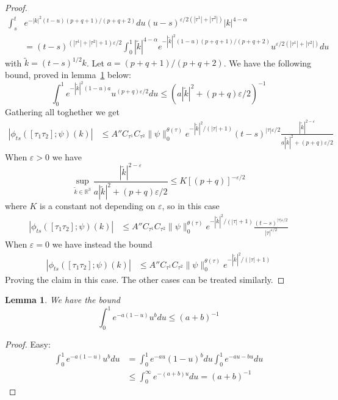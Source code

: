 \documentclass[a4paper,12pt,reqno]{amsart}
\newcommand{\1}{{\bf 1}}
\newcommand{\eps}{\varepsilon}
\newcommand{\RR}{\mathbb{R}}
\newtheorem{lemma}[theorem]{Lemma}
\begin{document}
\begin{proof}
\begin{equation*}
  \begin{split}
 \int_s^t & e^{-|k|^2 (t-u) (p+q+1)/(p+q+2)}   du
(u-s)^{\eps/2 (|\tau^1|+|\tau^2|)}
 |k|^{4-\alpha}
 \\ & = (t-s)^{(|\tau^1|+|\tau^2|+1)\eps/2}
          \int_0^1 |\tilde k|^{4-\alpha} e^{-|\tilde k|^2 (1-u) (p+q+1)/(p+q+2)}
u^{\eps/2 (|\tau^1|+|\tau^2|)} du
  \end{split}
\end{equation*}
with $\tilde k = (t-s)^{1/2} k$. Let $a = (p+q+1)/(p+q+2)$.
 We
have the following bound, proved in lemma~\ref{lemma:bound-int} below:
\begin{equation*}
\int_0^1 e^{-|\tilde k|^2 (1-u) a} u^{(p+q)\eps/2} du \le 
\left(a |\tilde k|^2   + (p+q)\eps/2\right)^{-1}
\end{equation*}
Gathering all toghether we get
\begin{equation*}
  \begin{split}
\left|\phi_{ts}([\tau_1 \tau_2];\psi)(k)\right|
&    \le A'' C_{\tau^1} C_{\tau^2} \|\psi\|_0^{\theta(\tau)}
e^{-|\tilde k|^2/(|\tau|+1)} (t-s)^{|\tau|\eps/2} \frac{|\tilde k|^{2-\eps}}{a |\tilde k|^2  + (p+q)\eps/2}
  \end{split}
\end{equation*}
When $\eps > 0$ we have
$$
\sup_{\tilde k \in \RR^3} \frac{|\tilde k|^{2-\eps}}{a |\tilde k|^2  + (p+q)\eps/2} \le K [(p+q)]^{-\eps/2}
$$
where $K$ is a constant not depending on $\eps$, so in this case
\begin{equation*}
  \begin{split}
\left|\phi_{ts}([\tau_1 \tau_2];\psi)(k)\right|
&    \le A'' C_{\tau^1} C_{\tau^2} \|\psi\|_0^{\theta(\tau)}
e^{-|\tilde k|^2/(|\tau|+1)} \frac{(t-s)^{|\tau|\eps/2}}{|\tau|^{\eps/2}}
  \end{split}
\end{equation*}
When $\eps = 0$ we have instead the bound
\begin{equation*}
  \begin{split}
\left|\phi_{ts}([\tau_1 \tau_2];\psi)(k)\right|
&    \le A'' C_{\tau^1} C_{\tau^2} \|\psi\|_0^{\theta(\tau)}
e^{-|\tilde k|^2/(|\tau|+1)}
  \end{split}
\end{equation*}
Proving the claim in this case. The other cases can be treated similarly.
\end{proof}

\begin{lemma}
\label{lemma:bound-int}
We have the bound
$$
\int_0^1 e^{-a(1- u)} u^{b} du \le (a+b)^{-1}
$$  
\end{lemma}
\begin{proof}
Easy:
\begin{equation*}
  \begin{split}
\int_0^1 e^{-a (1-u)} u^{b} du & =
    \int_0^1 e^{-a u} (1-u)^{b} du
    \int_0^1 e^{-a u - b u}  du
\\  & \le
    \int_0^\infty e^{-(a+b)u } du
= (a+b)^{-1}
  \end{split}
\end{equation*}
\end{proof}
\end{document}
